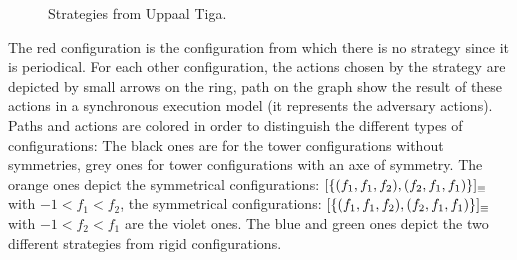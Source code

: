 \begin{figure}[htbp]
{
}
\caption{Strategies from Uppaal Tiga.} 
\label{fig:Strat}
\end{figure}
The red configuration is the configuration from which there is no strategy since it is periodical.
For each other configuration, the actions chosen by the strategy are depicted by small arrows on the ring, 
path on the graph show the result of these actions in a synchronous execution model (it represents the adversary actions).
Paths and actions are colored in order to distinguish the different types of configurations:  
The black ones are for the tower configurations without symmetries, grey ones for 
tower configurations with an axe of symmetry.
The orange ones depict the symmetrical configurations:  $[\{(f_1, f_1, f_2), (f_2, f_1, f_1)\}]_{\equiv}$ with $-1 < f_1 < f_2$, 
the symmetrical configurations:  $[\{(f_1, f_1, f_2), (f_2, f_1, f_1)\}]_{\equiv}$ with $-1 < f_2 < f_1$ are the violet ones.
The blue and green ones depict the two different strategies from rigid configurations.

